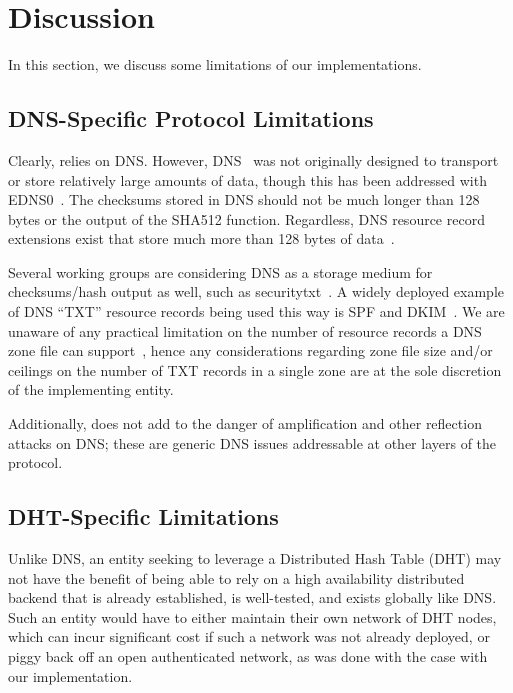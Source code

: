 \section{Discussion} \label{sec:discussion}

In this section, we discuss some limitations of our implementations.

\subsection{DNS-Specific Protocol Limitations}

Clearly, \DNSSYS{} relies on DNS. However, DNS~\cite{DNS1} was not originally
designed to transport or store relatively large amounts of data, though this has
been addressed with EDNS0~\cite{EDNS}. The checksums stored in DNS should not be
much longer than 128 bytes or the output of the SHA512 function. Regardless, DNS
resource record extensions exist that store much more than 128 bytes of
data~\cite{CERT, IPSECKEY, DANE3, DANE1}.

Several working groups are considering DNS as a storage medium for
checksums/hash output as well, such as securitytxt~\cite{draft-sectxt}. A widely
deployed example of DNS ``TXT'' resource records being used this way is SPF and
DKIM~\cite{DKIM}. We are unaware of any practical limitation on the number of
resource records a DNS zone file can support~\cite{DNS1}, hence any
considerations regarding zone file size and/or ceilings on the number of TXT
records in a single zone are at the sole discretion of the implementing entity.

Additionally, \DNSSYS{} does not add to the danger of amplification and other
reflection attacks on DNS; these are generic DNS issues addressable at other
layers of the protocol.


\subsection{DHT-Specific Limitations}

Unlike DNS, an entity seeking to leverage a Distributed Hash Table (DHT) may not
have the benefit of being able to rely on a high availability distributed
backend that is already established, is well-tested, and exists
globally like DNS. Such an entity would have to either maintain their own
network of DHT nodes, which can incur significant cost if such a network was not
already deployed, or piggy back off an open authenticated network, as was done
with the case with our \DHTSYS{} implementation.

